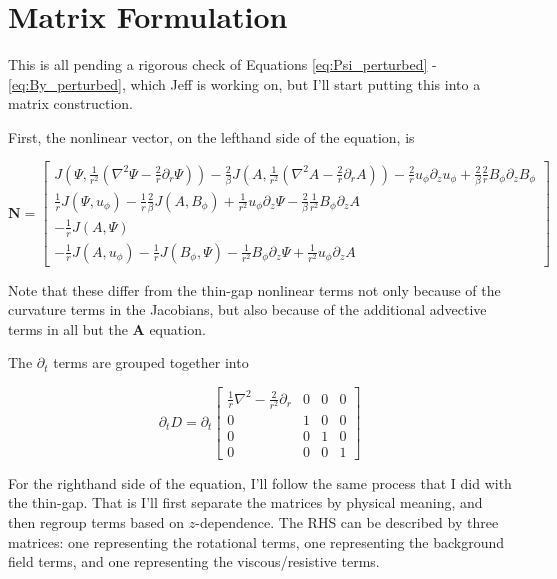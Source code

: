 \documentclass{paper}
\newcommand{\beq}{\begin{equation}}
\newcommand{\eeq}{\end{equation}}
\begin{document}
\section{Matrix Formulation}

This is all pending a rigorous check of Equations \ref{eq:Psi_perturbed} - \ref{eq:By_perturbed}, which Jeff is working on, but I'll start putting this into a matrix construction.

First, the nonlinear vector, on the lefthand side of the equation, is

\beq\label{eq:nonlinearvector}
\mathbf{N} = \left[\begin{matrix}
J\left(\Psi, \frac{1}{r^2} \left(\nabla^2 \Psi - \frac{2}{r}\partial_r \Psi \right) \right) - \frac{2}{\beta} J \left(A, \frac{1}{r^2} \left( \nabla^2 A - \frac{2}{r} \partial_r A\right)\right) - \frac{2}{r} u_\phi \partial_z u_\phi + \frac{2}{\beta} \frac{2}{r} B_\phi \partial_z B_\phi \\
\frac{1}{r} J \left(\Psi, u_\phi\right) - \frac{1}{r} \frac{2}{\beta} J \left(A, B_\phi\right) + \frac{1}{r^2} u_\phi \partial_z \Psi - \frac{2}{\beta} \frac{1}{r^2} B_\phi \partial_z A \\
-\frac{1}{r} J \left(A, \Psi\right)\\
-\frac{1}{r} J \left(A, u_\phi\right) - \frac{1}{r} J \left(B_\phi, \Psi\right) - \frac{1}{r^2} B_\phi \partial_z \Psi + \frac{1}{r^2} u_\phi \partial_z A
\end{matrix}\right] 
\eeq

Note that these differ from the thin-gap nonlinear terms not only because of the curvature terms in the Jacobians, but also because of the additional advective terms in all but the $\mathbf{A}$ equation.

The $\partial_t$ terms are grouped together into 

\beq
\partial_t D = \partial_t \left[\begin{matrix}
\frac{1}{r}\nabla^2 - \frac{2}{r^2} \partial_r & 0 & 0 & 0\\
0 & 1 & 0 & 0\\
0 & 0 & 1 & 0\\
0 & 0 & 0 & 1
\end{matrix}\right]
\eeq

For the righthand side of the equation, I'll follow the same process that I did with the thin-gap. That is I'll first separate the matrices by physical meaning, and then regroup terms based on $z$-dependence. The RHS can be described by three matrices: one representing the rotational terms, one representing the background field terms, and one representing the viscous/resistive terms.
\end{document}
